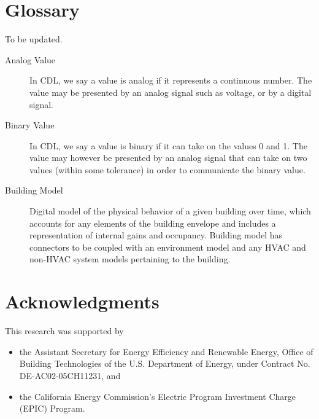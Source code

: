 \documentclass[letterpaper,10pt, openany,english]{sphinxmanual}
\begin{document}
\chapter{Glossary}
\label{\detokenize{glossary:glossary}}\label{\detokenize{glossary:sec-glossary}}\label{\detokenize{glossary::doc}}
To be updated.
\begin{description}
\item[{Analog Value\label{\detokenize{glossary:term-analog-value}}}] \leavevmode
In CDL, we say a value is analog if it represents a continuous
number. The value may be presented by an analog signal such as
voltage, or by a digital signal.

\item[{Binary Value\label{\detokenize{glossary:term-binary-value}}}] \leavevmode
In CDL, we say a value is binary if it can take on the values
0 and 1. The value may however be presented by an analog signal
that can take on two values (within some tolerance) in order
to communicate the binary value.

\item[{Building Model\label{\detokenize{glossary:term-building-model}}}] \leavevmode
Digital model of the physical behavior of a given building over time,
which accounts for any elements of the building envelope and includes a
representation of internal gains and occupancy. Building model has connectors
to be coupled with an environment model and any HVAC and non-HVAC system models
pertaining to the building.

\end{description}


\chapter{Acknowledgments}
\label{\detokenize{acknowledgments:acknowledgments}}\label{\detokenize{acknowledgments::doc}}
This research was supported by
\begin{itemize}
\item {} 
the Assistant Secretary for
Energy Efficiency and Renewable Energy, Office of Building Technologies
of the U.S. Department of Energy, under Contract No. DE-AC02-05CH11231, and

\item {} 
the California Energy Commission’s Electric Program Investment Charge (EPIC) Program.

\end{itemize}
\end{document}
